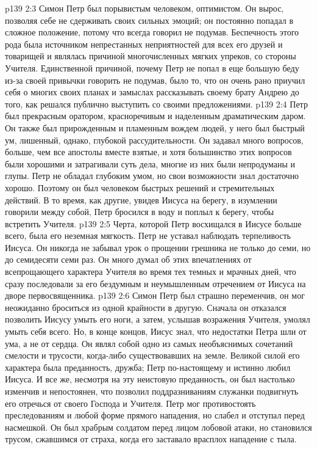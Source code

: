 \vs p139 2:3 \pc Симон Петр был порывистым человеком, оптимистом. Он вырос, позволяя себе не сдерживать своих сильных эмоций; он постоянно попадал в сложное положение, потому что всегда говорил не подумав. Беспечность этого рода была источником непрестанных неприятностей для всех его друзей и товарищей и являлась причиной многочисленных мягких упреков, со стороны Учителя. Единственной причиной, почему Петр не попал в еще большую беду из\hyp{}за своей привычки говорить не подумав, было то, что он очень рано приучил себя о многих своих планах и замыслах рассказывать своему брату Андрею до того, как решался публично выступить со своими предложениями.
\vs p139 2:4 Петр был прекрасным оратором, красноречивым и наделенным драматическим даром. Он также был прирожденным и пламенным вождем людей, у него был быстрый ум, лишенный, однако, глубокой рассудительности. Он задавал много вопросов, больше, чем все апостолы вместе взятые, и хотя большинство этих вопросов были хорошими и затрагивали суть дела, многие из них были непродуманы и глупы. Петр не обладал глубоким умом, но свои возможности знал достаточно хорошо. Поэтому он был человеком быстрых решений и стремительных действий. В то время, как другие, увидев Иисуса на берегу, в изумлении говорили между собой, Петр бросился в воду и поплыл к берегу, чтобы встретить Учителя.
\vs p139 2:5 \pc Черта, которой Петр восхищался в Иисусе больше всего, была его неземная мягкость. Петр не уставал наблюдать терпеливость Иисуса. Он никогда не забывал урок о прощении грешника не только до семи, но до семидесяти семи раз. Он много думал об этих впечатлениях от всепрощающего характера Учителя во время тех темных и мрачных дней, что сразу последовали за его бездумным и неумышленным отречением от Иисуса на дворе первосвященника.
\vs p139 2:6 \pc Симон Петр был страшно переменчив, он мог неожиданно броситься из одной крайности в другую. Сначала он отказался позволить Иисусу умыть его ноги, а затем, услышав возражения Учителя, умолял умыть себя всего. Но, в конце концов, Иисус знал, что недостатки Петра шли от ума, а не от сердца. Он являл собой одно из самых необъяснимых сочетаний смелости и трусости, когда\hyp{}либо существовавших на земле. Великой силой его характера была преданность, дружба; Петр по\hyp{}настоящему и истинно любил Иисуса. И все же, несмотря на эту неистовую преданность, он был настолько изменчив и непостоянен, что позволил поддразниваниям служанки подвигнуть его отречься от своего Господа и Учителя. Петр мог противостоять преследованиям и любой форме прямого нападения, но слабел и отступал перед насмешкой. Он был храбрым солдатом перед лицом лобовой атаки, но становился трусом, сжавшимся от страха, когда его заставало врасплох нападение с тыла.
